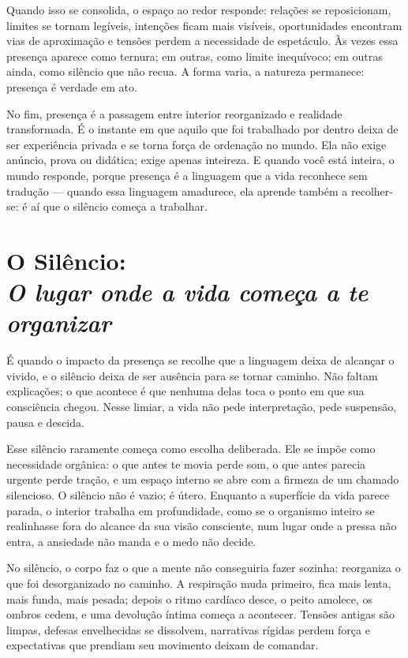 \documentclass[12pt]{book}
\begin{document}
Quando isso se consolida, o espaço ao redor responde: relações se reposicionam, limites se tornam legíveis, intenções ficam mais visíveis, oportunidades encontram vias de aproximação e tensões perdem a necessidade de espetáculo. Às vezes essa presença aparece como ternura; em outras, como limite inequívoco; em outras ainda, como silêncio que não recua. A forma varia, a natureza permanece: presença é verdade em ato.

No fim, presença é a passagem entre interior reorganizado e realidade transformada. É o instante em que aquilo que foi trabalhado por dentro deixa de ser experiência privada e se torna força de ordenação no mundo. Ela não exige anúncio, prova ou didática; exige apenas inteireza. E quando você está inteira, o mundo responde, porque presença é a linguagem que a vida reconhece sem tradução — quando essa linguagem amadurece, ela aprende também a recolher-se: é aí que o silêncio começa a trabalhar.

\chapter[O Silêncio: O lugar onde a vida começa a te organizar]{O Silêncio:\\[0.4ex]\large\itshape O lugar onde a vida começa a te organizar}

É quando o impacto da presença se recolhe que a linguagem deixa de alcançar o vivido, e o silêncio deixa de ser ausência para se tornar caminho. Não faltam explicações; o que acontece é que nenhuma delas toca o ponto em que sua consciência chegou. Nesse limiar, a vida não pede interpretação, pede suspensão, pausa e descida.

Esse silêncio raramente começa como escolha deliberada. Ele se impõe como necessidade orgânica: o que antes te movia perde som, o que antes parecia urgente perde tração, e um espaço interno se abre com a firmeza de um chamado silencioso. O silêncio não é vazio; é útero. Enquanto a superfície da vida parece parada, o interior trabalha em profundidade, como se o organismo inteiro se realinhasse fora do alcance da sua visão consciente, num lugar onde a pressa não entra, a ansiedade não manda e o medo não decide.

No silêncio, o corpo faz o que a mente não conseguiria fazer sozinha: reorganiza o que foi desorganizado no caminho. A respiração muda primeiro, fica mais lenta, mais funda, mais pesada; depois o ritmo cardíaco desce, o peito amolece, os ombros cedem, e uma devolução íntima começa a acontecer. Tensões antigas são limpas, defesas envelhecidas se dissolvem, narrativas rígidas perdem força e expectativas que prendiam seu movimento deixam de comandar.
\end{document}
